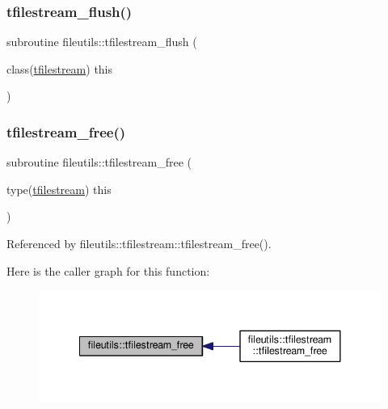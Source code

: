 \mbox{\label{namespacefileutils_aed117908fc58fe14559073780dce043b}} 
\subsubsection{\texorpdfstring{tfilestream\+\_\+flush()}{tfilestream\_flush()}}
{\footnotesize\ttfamily subroutine fileutils\+::tfilestream\+\_\+flush (\begin{DoxyParamCaption}\item[{class(\mbox{\hyperlink{structfileutils_1_1tfilestream}{tfilestream}})}]{this }\end{DoxyParamCaption})\hspace{0.3cm}{\ttfamily [private]}}

\mbox{\label{namespacefileutils_a5c9784aa40b01ea30ef204e7aeb9db9e}} 
\subsubsection{\texorpdfstring{tfilestream\+\_\+free()}{tfilestream\_free()}}
{\footnotesize\ttfamily subroutine fileutils\+::tfilestream\+\_\+free (\begin{DoxyParamCaption}\item[{type(\mbox{\hyperlink{structfileutils_1_1tfilestream}{tfilestream}})}]{this }\end{DoxyParamCaption})\hspace{0.3cm}{\ttfamily [private]}}



Referenced by fileutils\+::tfilestream\+::tfilestream\+\_\+free().

Here is the caller graph for this function\+:
\nopagebreak
\begin{figure}[H]
\begin{center}
\leavevmode
\includegraphics[width=338pt]{namespacefileutils_a5c9784aa40b01ea30ef204e7aeb9db9e_icgraph}
\end{center}
\end{figure}
\mbox{\label{namespacefileutils_a9b6ffe40088ad819c1e793b2bc91b01e}} 

